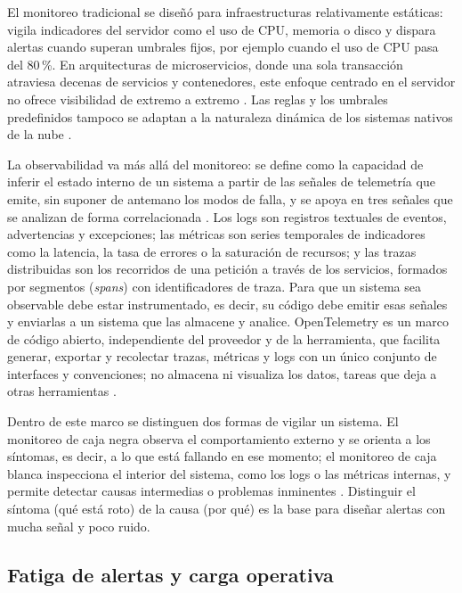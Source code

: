 El monitoreo tradicional se diseñó para infraestructuras relativamente estáticas: vigila indicadores del servidor como el uso de CPU, memoria o disco y dispara alertas cuando superan umbrales fijos, por ejemplo cuando el uso de CPU pasa del 80\,\%. En arquitecturas de microservicios, donde una sola transacción atraviesa decenas de servicios y contenedores, este enfoque centrado en el servidor no ofrece visibilidad de extremo a extremo \cite{nellutla2026_observability}. Las reglas y los umbrales predefinidos tampoco se adaptan a la naturaleza dinámica de los sistemas nativos de la nube \cite{wang2025_cloudnative_rca}.

La observabilidad va más allá del monitoreo: se define como la capacidad de inferir el estado interno de un sistema a partir de las señales de telemetría que emite, sin suponer de antemano los modos de falla, y se apoya en tres señales que se analizan de forma correlacionada \cite{nellutla2026_observability}. Los logs son registros textuales de eventos, advertencias y excepciones; las métricas son series temporales de indicadores como la latencia, la tasa de errores o la saturación de recursos; y las trazas distribuidas son los recorridos de una petición a través de los servicios, formados por segmentos (\textit{spans}) con identificadores de traza. Para que un sistema sea observable debe estar instrumentado, es decir, su código debe emitir esas señales y enviarlas a un sistema que las almacene y analice. OpenTelemetry es un marco de código abierto, independiente del proveedor y de la herramienta, que facilita generar, exportar y recolectar trazas, métricas y logs con un único conjunto de interfaces y convenciones; no almacena ni visualiza los datos, tareas que deja a otras herramientas \cite{opentelemetry_docs}.

Dentro de este marco se distinguen dos formas de vigilar un sistema. El monitoreo de caja negra observa el comportamiento externo y se orienta a los síntomas, es decir, a lo que está fallando en ese momento; el monitoreo de caja blanca inspecciona el interior del sistema, como los logs o las métricas internas, y permite detectar causas intermedias o problemas inminentes \cite{ewaschuk2016_sre_monitoring}. Distinguir el síntoma (qué está roto) de la causa (por qué) es la base para diseñar alertas con mucha señal y poco ruido.

\subsection{Fatiga de alertas y carga operativa}\label{sec:ant_fatiga}


